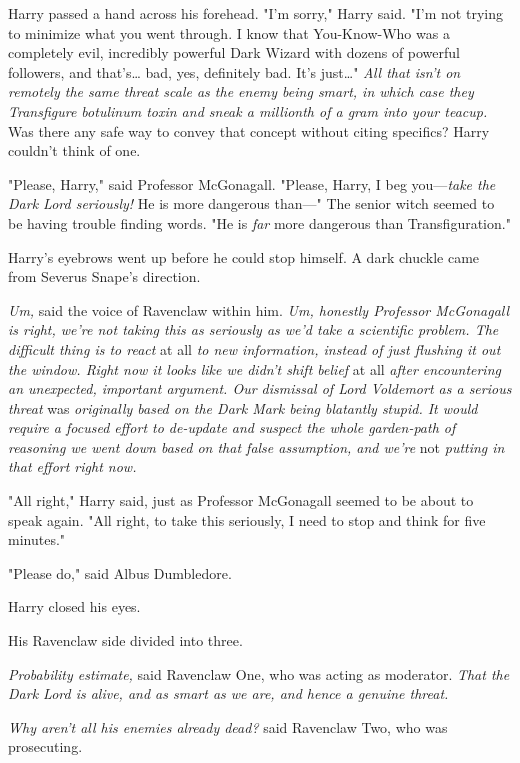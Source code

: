 Harry passed a hand across his forehead. "I'm sorry," Harry said. "I'm not 
trying to minimize what you went through. I know that You-Know-Who was a 
completely evil, incredibly powerful Dark Wizard with dozens of powerful 
followers, and that's{\ldots} bad, yes, definitely bad. It's just{\ldots}" 
\emph{All that isn't on remotely the same threat scale as the enemy being 
smart, in which case they Transfigure botulinum toxin and sneak a millionth of 
a gram into your teacup.} Was there any safe way to convey that concept without 
citing specifics? Harry couldn't think of one.

"Please, Harry," said Professor McGonagall. "Please, Harry, I beg 
you---\emph{take the Dark Lord seriously!} He is more dangerous than---" The 
senior witch seemed to be having trouble finding words. "He is \emph{far} more 
dangerous than Transfiguration."

Harry's eyebrows went up before he could stop himself. A dark chuckle came from 
Severus Snape's direction.

\emph{Um,} said the voice of Ravenclaw within him. \emph{Um, honestly Professor 
McGonagall is right, we're not taking this as seriously as we'd take a 
scientific problem. The difficult thing is to react} at all \emph{to new 
information, instead of just flushing it out the window. Right now it looks 
like we didn't shift belief} at all \emph{after encountering an unexpected, 
important argument. Our dismissal of Lord Voldemort as a serious threat} 
was \emph{originally based on the Dark Mark being blatantly stupid. It would 
require a focused effort to de-update and suspect the whole garden-path of 
reasoning we went down based on that false assumption, and we're} not \emph{
putting in that effort right now.}

"All right," Harry said, just as Professor McGonagall seemed to be about to 
speak again. "All right, to take this seriously, I need to stop and think for 
five minutes."

"Please do," said Albus Dumbledore.

Harry closed his eyes.

His Ravenclaw side divided into three.

\emph{Probability estimate,} said Ravenclaw One, who was acting as moderator. 
\emph{That the Dark Lord is alive, and as smart as we are, and hence a genuine 
threat.}

\emph{Why aren't all his enemies already dead?} said Ravenclaw Two, who was 
prosecuting.

